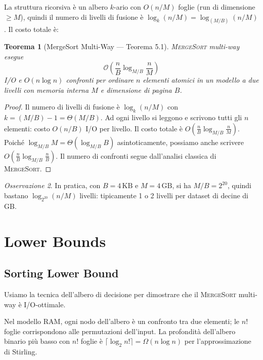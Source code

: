 \documentclass[12pt, a4paper, oneside]{book}
\theoremstyle{plain}
\newtheorem{teorema}{Teorema}[chapter]
\theoremstyle{definition}
\theoremstyle{remark}
\newtheorem{osservazione}[teorema]{Osservazione}
\newcommand{\OO}[1]{\mathcal{O}\!\left(#1\right)}
\begin{document}
La struttura ricorsiva è un albero $k$-ario con $O(n/M)$ foglie (run di dimensione $\ge M$), quindi il numero di livelli di fusione è $\log_k(n/M) = \log_{(M/B)}(n/M)$. Il costo totale è:

\begin{teorema}[MergeSort Multi-Way --- Teorema 5.1]
\textsc{MergeSort} multi-way esegue
\[
\OO{\frac{n}{B}\log_{M/B}\frac{n}{M}}
\]
I/O e $O(n\log n)$ confronti per ordinare $n$ elementi atomici in un modello a due livelli con memoria interna $M$ e dimensione di pagina $B$.
\end{teorema}

\begin{proof}
Il numero di livelli di fusione è $\log_k(n/M)$ con $k = (M/B)-1 = \Theta(M/B)$. Ad ogni livello si leggono e scrivono tutti gli $n$ elementi: costo $O(n/B)$ I/O per livello. Il costo totale è $O\!\left(\frac{n}{B}\log_{M/B}\frac{n}{M}\right)$. Poiché $\log_{M/B}M = \Theta(\log_{M/B}B)$ asintoticamente, possiamo anche scrivere $O\!\left(\frac{n}{B}\log_{M/B}\frac{n}{B}\right)$. Il numero di confronti segue dall'analisi classica di \textsc{MergeSort}.
\end{proof}

\begin{osservazione}
In pratica, con $B = 4\,\text{KB}$ e $M = 4\,\text{GB}$, si ha $M/B = 2^{20}$, quindi bastano $\log_{2^{20}}(n/M)$ livelli: tipicamente 1 o 2 livelli per dataset di decine di GB.
\end{osservazione}

\section{Lower Bounds}

\subsection{Sorting Lower Bound}

Usiamo la tecnica dell'albero di decisione per dimostrare che il \textsc{MergeSort} multi-way è I/O-ottimale.

Nel modello RAM, ogni nodo dell'albero è un confronto tra due elementi; le $n!$ foglie corrispondono alle permutazioni dell'input. La profondità dell'albero binario più basso con $n!$ foglie è $\lceil\log_2 n!\rceil = \Omega(n\log n)$ per l'approssimazione di Stirling.
\end{document}
